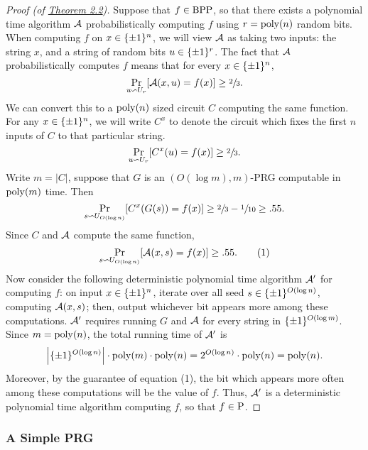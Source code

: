 \documentclass[11pt]{article}
\begin{document}
\begin{proof}[Proof \textup{(of \hyperref[t-2-2]{Theorem 2.2})}] Suppose that $f \in \BPP$, so that there exists a polynomial time algorithm $\cA$ probabilistically computing $f$ using $r = \poly(n)$ random bits. When computing $f$ on $x \in \pmon$, we will view $\cA$ as taking two inputs: the string $x$, and a string of random bits $u \in \pmo^{r}$. The fact that $\cA$ probabilistically computes $f$ means that for every $x \in \pmon$, 
\begin{equation*}
    \Pr_{u \backsim U_r}[\cA(x, u) = f(x)] \geq \sfrac{2}{3}. 
\end{equation*}
We can convert this to a $\poly(n)$ sized circuit $C$ computing the same function. For any $x \in \pmon$, we will write $C^x$ to denote the circuit which fixes the first $n$ inputs of $C$ to that particular string.
\begin{equation*}
    \Pr_{u \backsim U_r}[C^{x}(u) = f(x)] \geq \sfrac{2}{3}. 
\end{equation*}
Write $m = |C|$, suppose that $G$ is an $(O(\log m), m)$-PRG computable in $\poly(m)$ time. Then 
\begin{equation*}
    \Pr_{s \backsim U_{O(\log n)}}[C^{x}(G(s)) = f(x)] \geq \sfrac{2}{3} - \sfrac{1}{10} \geq .55.
\end{equation*}
Since $C$ and $\cA$ compute the same function, 
\begin{equation*}
    \Pr_{s \backsim U_{O(\log n)}}[\cA(x, s) = f(x)] \geq  .55. \tag{1}
\end{equation*}
Now consider the following deterministic polynomial time algorithm $\cA'$ for computing $f$: on input $x \in \pmon$, iterate over all seed $s \in \pmo^{O(\log n)}$, computing $\cA(x, s)$; then, output whichever bit appears more among these computations. $\cA'$ requires running $G$ and $\cA$ for every string in $\pmo^{O(\log m)}$. Since $m = \poly(n)$, the total running time of $\cA'$ is 
\begin{equation*}
    \left|\pmo^{O(\log n)}\right| \cdot \poly(m) \cdot \poly(n) = 2^{O(\log n)} \cdot \poly(n) = \poly(n).
\end{equation*}
Moreover, by the guarantee of equation (1), the bit which appears more often among these computations will be the value of $f$. Thus, $\cA'$ is a deterministic polynomial time algorithm computing $f$, so that $f \in \P$.
\end{proof}

\subsubsection{A Simple PRG}
\end{document}

